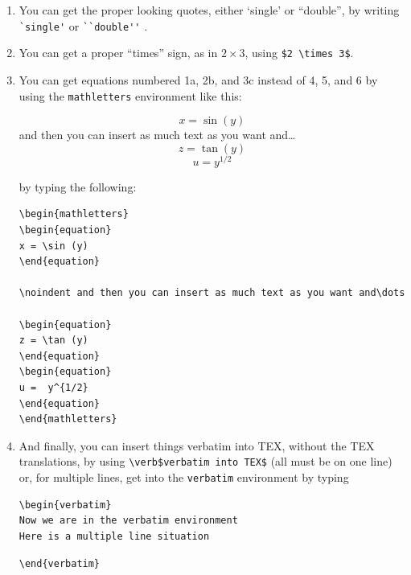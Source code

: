 \documentclass[12pt,preprint]{aastex}
\begin{document}
\begin{enumerate}
\item You can get the proper looking quotes, either `single' or
``double'', by writing \verb$`single'$ or \verb$``double''$ . 

\item You can get a proper ``times'' sign, as in $2 \times 3$, using
\verb=$2 \times 3$=. 

\item You can get equations numbered 1a, 2b, and 3c instead of 4, 5,
and 6 by using the \verb$mathletters$ environment like this:
\begin{mathletters}
\begin{equation}
x = \sin (y)
\end{equation}
\noindent and then you can insert as much text as you want and\dots
\begin{equation}
z = \tan (y)
\end{equation}
\begin{equation}
u =  y^{1/2}
\end{equation}
\end{mathletters}
by typing the following:
\begin{verbatim}
\begin{mathletters}
\begin{equation}
x = \sin (y)
\end{equation}

\noindent and then you can insert as much text as you want and\dots

\begin{equation}
z = \tan (y)
\end{equation}
\begin{equation}
u =  y^{1/2}
\end{equation}
\end{mathletters}
\end{verbatim}

\item And finally, you can insert things verbatim into TEX, without the
TEX translations, by using \verb=\verb$verbatim into TEX$= (all must be
on one line) or, for multiple lines, get into the \verb$verbatim$
environment by typing

\begin{verbatim}
\begin{verbatim}
Now we are in the verbatim environment
Here is a multiple line situation
\end{verbatim}
\verb$\end{verbatim}$
\end{enumerate}
\end{document}
